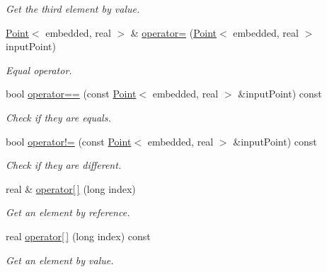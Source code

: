 \begin{DoxyCompactItemize}
\begin{DoxyCompactList}\small\item\em \-Get the third element by value. \end{DoxyCompactList}\item 
\hyperlink{class_point}{\-Point}$<$ embedded, real $>$ \& \hyperlink{class_point_a448799c65927e710a92fcd5b715e3b21}{operator=} (\hyperlink{class_point}{\-Point}$<$ embedded, real $>$ input\-Point)
\begin{DoxyCompactList}\small\item\em \-Equal operator. \end{DoxyCompactList}\item 
bool \hyperlink{class_point_a85d75524d6a63f080aca5cec2eca7ec9}{operator==} (const \hyperlink{class_point}{\-Point}$<$ embedded, real $>$ \&input\-Point) const 
\begin{DoxyCompactList}\small\item\em \-Check if they are equals. \end{DoxyCompactList}\item 
bool \hyperlink{class_point_af3dfd6f86d375de9c2bd412f9ba31c87}{operator!=} (const \hyperlink{class_point}{\-Point}$<$ embedded, real $>$ \&input\-Point) const 
\begin{DoxyCompactList}\small\item\em \-Check if they are different. \end{DoxyCompactList}\item 
\hypertarget{class_point_ab8b7d24713bc91d95cced47933f06198}{real \& \hyperlink{class_point_ab8b7d24713bc91d95cced47933f06198}{operator\mbox{[}$\,$\mbox{]}} (long index)}\label{class_point_ab8b7d24713bc91d95cced47933f06198}

\begin{DoxyCompactList}\small\item\em \-Get an element by reference. \end{DoxyCompactList}\item 
\hypertarget{class_point_a6fb29d763d4c786452b071e790db86fc}{real \hyperlink{class_point_a6fb29d763d4c786452b071e790db86fc}{operator\mbox{[}$\,$\mbox{]}} (long index) const }\label{class_point_a6fb29d763d4c786452b071e790db86fc}

\begin{DoxyCompactList}\small\item\em \-Get an element by value. \end{DoxyCompactList}\end{DoxyCompactItemize}
